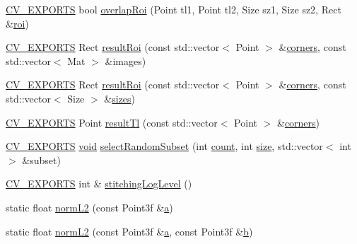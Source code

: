 \begin{DoxyCompactItemize}
\hyperlink{core_2types__c_8h_a1bf9f0e121b54272da02379cfccd0a2b}{C\-V\-\_\-\-E\-X\-P\-O\-R\-T\-S} bool \hyperlink{namespacecv_1_1detail_a46474c7903d2a991c8179c6852b9be03}{overlap\-Roi} (Point tl1, Point tl2, Size sz1, Size sz2, Rect \&\hyperlink{legacy_8hpp_a22e52b2b51d064865d3ac2f27b308c33}{roi})
\item 
\hyperlink{core_2types__c_8h_a1bf9f0e121b54272da02379cfccd0a2b}{C\-V\-\_\-\-E\-X\-P\-O\-R\-T\-S} Rect \hyperlink{namespacecv_1_1detail_af4cef2fea851e119f263b04f3a9b2c3f}{result\-Roi} (const std\-::vector$<$ Point $>$ \&\hyperlink{imgproc__c_8h_a223e965e192c7025d6c6be77305f515b}{corners}, const std\-::vector$<$ Mat $>$ \&images)
\item 
\hyperlink{core_2types__c_8h_a1bf9f0e121b54272da02379cfccd0a2b}{C\-V\-\_\-\-E\-X\-P\-O\-R\-T\-S} Rect \hyperlink{namespacecv_1_1detail_ae84ca003332f16716bf0ab66ee76b511}{result\-Roi} (const std\-::vector$<$ Point $>$ \&\hyperlink{imgproc__c_8h_a223e965e192c7025d6c6be77305f515b}{corners}, const std\-::vector$<$ Size $>$ \&\hyperlink{imgproc__c_8h_afcc291f06aa904173ea1ada4741707f6}{sizes})
\item 
\hyperlink{core_2types__c_8h_a1bf9f0e121b54272da02379cfccd0a2b}{C\-V\-\_\-\-E\-X\-P\-O\-R\-T\-S} Point \hyperlink{namespacecv_1_1detail_a6c8babefd7f37acface29b31025a7705}{result\-Tl} (const std\-::vector$<$ Point $>$ \&\hyperlink{imgproc__c_8h_a223e965e192c7025d6c6be77305f515b}{corners})
\item 
\hyperlink{core_2types__c_8h_a1bf9f0e121b54272da02379cfccd0a2b}{C\-V\-\_\-\-E\-X\-P\-O\-R\-T\-S} \hyperlink{legacy_8hpp_a8bb47f092d473522721002c86c13b94e}{void} \hyperlink{namespacecv_1_1detail_a6256319ce5b0aef2da6a828650c86b6a}{select\-Random\-Subset} (int \hyperlink{tracking_8hpp_a88d78b1935cd8bdee70a44eaaf326b1e}{count}, int \hyperlink{legacy_8hpp_ae97003f8d5c64cdfb99f6f2606d121b6}{size}, std\-::vector$<$ int $>$ \&subset)
\item 
\hyperlink{core_2types__c_8h_a1bf9f0e121b54272da02379cfccd0a2b}{C\-V\-\_\-\-E\-X\-P\-O\-R\-T\-S} int \& \hyperlink{namespacecv_1_1detail_a7a529b8d39c07b28c4890e0ec1bb2c0c}{stitching\-Log\-Level} ()
\item 
static float \hyperlink{namespacecv_1_1detail_a320d142f241654dafc74f33384919104}{norm\-L2} (const Point3f \&\hyperlink{legacy_8hpp_a1031d0e0a97a340abfe0a6ab9e831045}{a})
\item 
static float \hyperlink{namespacecv_1_1detail_aac7057d4a239d1bbc794559bbd0f11e6}{norm\-L2} (const Point3f \&\hyperlink{legacy_8hpp_a1031d0e0a97a340abfe0a6ab9e831045}{a}, const Point3f \&\hyperlink{legacy_8hpp_ac04272e8ca865b8fba18d36edae9fd2a}{b})

\end{DoxyCompactItemize}
